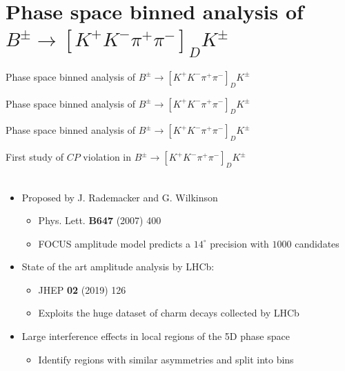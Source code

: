 \documentclass{beamer}
\begin{document}
\section{Phase space binned analysis of \texorpdfstring{$B^\pm\to[K^+K^-\pi^+\pi^-]_DK^\pm$}{B2DKD2KKpipi}}
\begin{frame}{Phase space binned analysis of $B^\pm\to[K^+K^-\pi^+\pi^-]_DK^\pm$}
  \begin{center}
    {\huge Phase space binned analysis of $B^\pm\to[K^+K^-\pi^+\pi^-]_DK^\pm$}
  \end{center}
\end{frame}

\begin{frame}{Phase space binned analysis of $B^\pm\to[K^+K^-\pi^+\pi^-]_DK^\pm$}
  \begin{center}
    \Large First study of $C\!P$ violation in $B^\pm\to[K^+K^-\pi^+\pi^-]_DK^\pm$\\~\\
  \end{center}
  \begin{itemize}
    \setlength\itemsep{1.0em}
    \item{Proposed by J. Rademacker and G. Wilkinson}
    \begin{itemize}
      \item{Phys. Lett. \textbf{B647} (2007) 400}
      \item{FOCUS amplitude model predicts a $14^\circ$ precision with $1000$ candidates}
    \end{itemize}
    \item{State of the art amplitude analysis by LHCb:}
    \begin{itemize}
      \item{JHEP \textbf{02} (2019) 126}
      \item{Exploits the huge dataset of charm decays collected by LHCb}
    \end{itemize}
    \item{Large interference effects in local regions of the 5D phase space}
    \begin{itemize}
      \item{Identify regions with similar asymmetries and split into bins}
    \end{itemize}
  \end{itemize}
\end{frame}
\end{document}
